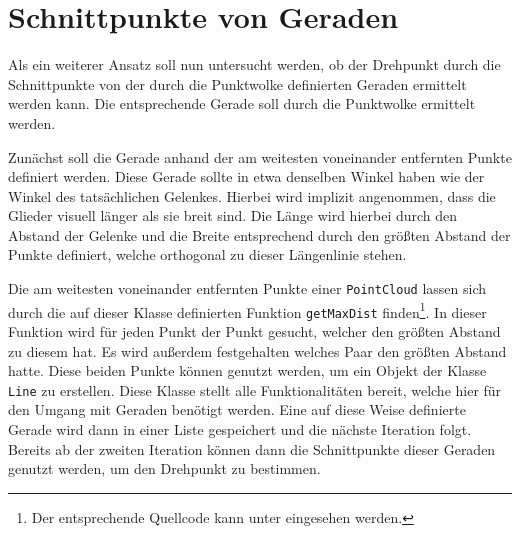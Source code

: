 


\section{Schnittpunkte von Geraden}\label{ch:schnittpunkt_gerade}

Als ein weiterer Ansatz soll nun untersucht werden, ob der Drehpunkt durch die Schnittpunkte von der durch die Punktwolke definierten Geraden ermittelt werden kann.
Die entsprechende Gerade soll durch die Punktwolke ermittelt werden.

Zunächst soll die Gerade anhand der am weitesten voneinander entfernten Punkte definiert werden.
Diese Gerade sollte in etwa denselben Winkel haben wie der Winkel des tatsächlichen Gelenkes.
Hierbei wird implizit angenommen, dass die Glieder visuell länger als sie breit sind.
Die Länge wird hierbei durch den Abstand der Gelenke und die Breite entsprechend durch den grö{\ss}ten Abstand der Punkte definiert, welche orthogonal zu dieser Längenlinie stehen.

Die am weitesten voneinander entfernten Punkte einer \lstinline{PointCloud} lassen sich durch die auf dieser Klasse definierten Funktion \lstinline{getMaxDist} finden\footnote{Der entsprechende Quellcode kann unter  eingesehen werden.}.
In dieser Funktion wird für jeden Punkt der Punkt gesucht, welcher den grö{\ss}ten Abstand zu diesem hat. Es wird au{\ss}erdem festgehalten welches Paar den grö{\ss}ten Abstand hatte.
Diese beiden Punkte können genutzt werden, um ein Objekt der Klasse \lstinline{Line} zu erstellen.
Diese Klasse stellt alle Funktionalitäten bereit, welche hier für den Umgang mit Geraden benötigt werden.
Eine auf diese Weise definierte Gerade wird dann in einer Liste gespeichert und die nächste Iteration folgt.
Bereits ab der zweiten Iteration können dann die Schnittpunkte dieser Geraden genutzt werden, um den Drehpunkt zu bestimmen.

